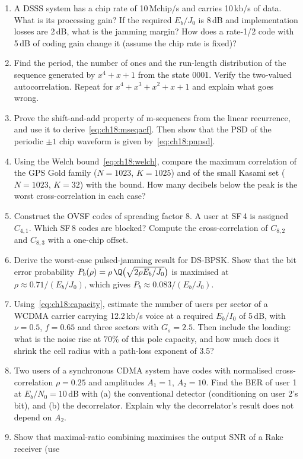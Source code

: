 \problems
\begin{enumerate}[label=\thechapter.\arabic*]
\item A DSSS system has a chip rate of 10\,Mchip/s and carries 10\,kb/s of data. What is its
processing gain? If the required $E_b/J_0$ is 8\,dB and implementation losses are 2\,dB, what is
the jamming margin? How does a rate-1/2 code with 5\,dB of coding gain change it (assume the
chip rate is fixed)?
\item Find the period, the number of ones and the run-length distribution of the sequence
generated by $x^4+x+1$ from the state 0001. Verify the two-valued autocorrelation. Repeat for
$x^4+x^3+x^2+x+1$ and explain what goes wrong.
\item Prove the shift-and-add property of m-sequences from the linear recurrence, and use it to
derive~\eqref{eq:ch18:mseqacf}. Then show that the PSD of the periodic $\pm1$ chip waveform is
given by~\eqref{eq:ch18:pnpsd}.
\item Using the Welch bound~\eqref{eq:ch18:welch}, compare the maximum correlation of the GPS Gold
family ($N=1023$, $K=1025$) and of the small Kasami set ($N=1023$, $K=32$) with the bound. How
many decibels below the peak is the worst cross-correlation in each case?
\item Construct the OVSF codes of spreading factor 8. A user at SF\,4 is assigned $C_{4,1}$. Which
SF\,8 codes are blocked? Compute the cross-correlation of $C_{8,2}$ and $C_{8,3}$ with a one-chip
offset.
\item Derive the worst-case pulsed-jamming result for DS-BPSK. Show that the bit error
probability $P_b(\rho)=\rho\,\Q\big(\sqrt{2\rho E_b/J_0}\big)$ is maximised at
$\rho\approx0.71/(E_b/J_0)$, which gives $P_b\approx0.083/(E_b/J_0)$.
\item Using~\eqref{eq:ch18:capacity}, estimate the number of users per sector of a WCDMA carrier
carrying 12.2\,kb/s voice at a required $E_b/I_0$ of 5\,dB, with $\nu=0.5$, $f=0.65$ and three
sectors with $G_s=2.5$. Then include the loading: what is the noise rise at 70\% of this pole
capacity, and how much does it shrink the cell radius with a path-loss exponent of 3.5?
\item Two users of a synchronous CDMA system have codes with normalised cross-correlation
$\rho=0.25$ and amplitudes $A_1=1$, $A_2=10$. Find the BER of user 1 at $E_b/N_0=10$\,dB with
(a) the conventional detector (conditioning on user 2's bit), and (b) the decorrelator. Explain
why the decorrelator's result does not depend on $A_2$.
\item Show that maximal-ratio combining maximises the output SNR of a Rake receiver (use

\end{enumerate}
